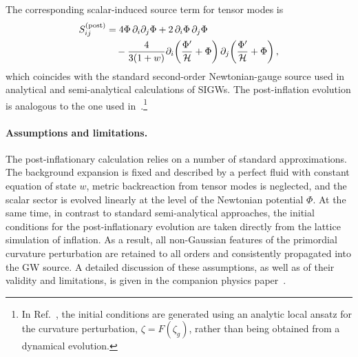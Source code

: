\documentclass[aps, nofootinbib,superscriptaddress, preprintnumbers, longbibliography]{article}
\begin{document}
The corresponding scalar-induced source term for tensor modes is
\begin{equation}
\label{eq:GW_source_post}
\begin{split}
S_{ij}^{(\rm post)}
&=
4\Phi\,\partial_i\partial_j\Phi
+2\,\partial_i\Phi\,\partial_j\Phi \\
&\quad
-\frac{4}{3(1+w)}
\partial_i\!\left(\frac{\Phi'}{\mathcal{H}}+\Phi\right)
\partial_j\!\left(\frac{\Phi'}{\mathcal{H}}+\Phi\right),
\end{split}
\end{equation}
which coincides with the standard second-order Newtonian-gauge source used in analytical and semi-analytical calculations of SIGWs. The post-inflation evolution is analogous to the one used in~\cite{Ning:2026nfs}.\footnote{In Ref.~\cite{Ning:2026nfs}, the initial conditions are generated using an analytic local ansatz for the curvature perturbation, $\zeta = F(\zeta_g)$, rather than being obtained from a dynamical evolution.}

\paragraph{Assumptions and limitations.}
The post-inflationary calculation relies on a number of standard approximations. The background expansion is fixed and described by a perfect fluid with constant equation of state $w$, metric backreaction from tensor modes is neglected, and the scalar sector is evolved linearly at the level of the Newtonian potential $\Phi$. At the same time, in contrast to standard semi-analytical approaches, the initial conditions for the post-inflationary evolution are taken directly from the lattice simulation of inflation. As a result, all non-Gaussian features of the primordial curvature perturbation are retained to all orders and consistently propagated into the GW source. A detailed discussion of these assumptions, as well as of their validity and limitations, is given in the companion physics paper~\cite{gwpaper}.
\end{document}
